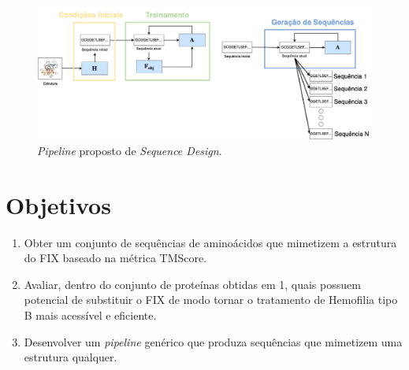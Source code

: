 \begin{figure}[H]
  \centering
  \includegraphics[width=.8\textwidth]{figuras/metodologia-pipeline_proposta.jpg}
  \caption{\textit{Pipeline} proposto de \textit{Sequence Design}.}
  \label{fig:proposta}
\end{figure}

\section{Objetivos}

\begin{enumerate}
  \item Obter um conjunto de sequências de aminoácidos que mimetizem a estrutura do FIX baseado na métrica TMScore.
  \item Avaliar, dentro do conjunto de proteínas obtidas em 1, quais possuem potencial de substituir o FIX de modo tornar o tratamento de Hemofilia tipo B mais acessível e eficiente.
  \item Desenvolver um \textit{pipeline} genérico que produza sequências que mimetizem uma estrutura qualquer.
\end{enumerate}
